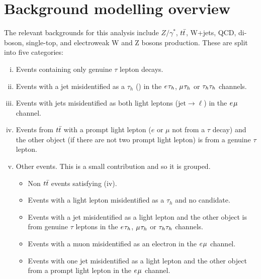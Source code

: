\section{Background modelling overview}
\label{sec:background_modelling}

The relevant backgrounds for this analysis include $Z/\gamma^*$, $t\bar{t}$, W+jets, \ac{QCD}, di-boson, single-top, and electroweak W and Z bosons production.
These are split into five categories:
\begin{enumerate}[i)]
  \item Events containing only genuine $\tau$ lepton decays.
  \item Events with a jet misidentified as a $\tau_h$ (\jtth) in the $e_{}\tau_{h}$, $\mu_{}\tau_{h}$ or $\tau_{h}\tau_{h}$ channels.
  \item Events with jets misidentified as both light leptons ($\text{jet}\rightarrow \ell$) in the $e_{}\mu_{}$ channel.
  \item Events from $t\bar{t}$ with a prompt light lepton ($e$ or $\mu$ not from a $\tau$ decay) and the other object (if there are not two prompt light lepton) is from a genuine $\tau$ lepton.
  \item Other events. This is a small contribution and so it is grouped.
  \begin{itemize}
    \item Non $t\bar{t}$ events satisfying (iv).
    \item Events with a light lepton misidentified as a $\tau_h$ and no \jtth candidate. 
    \item Events with a jet misidentified as a light lepton and the other object is from genuine $\tau$ leptons in the $e_{}\tau_{h}$, $\mu_{}\tau_{h}$ or $\tau_{h}\tau_{h}$ channels.
    \item Events with a muon misidentified as an electron in the $e_{}\mu_{}$ channel.
    \item Events with one jet misidentified as a light lepton and the other object from a prompt light lepton in the $e_{}\mu_{}$ channel.
   \end{itemize}
\end{enumerate}

